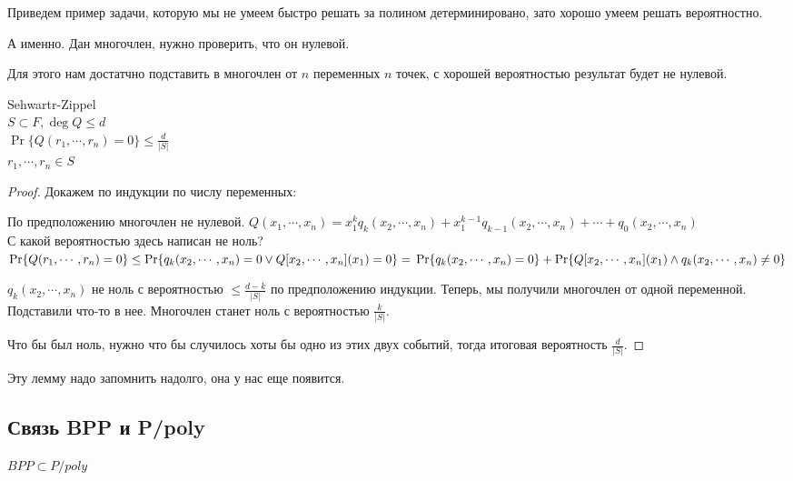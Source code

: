 Приведем пример задачи, которую мы не умеем быстро решать за полином детерминировано, 
зато хорошо умеем решать вероятностно. 

А именно. Дан многочлен, нужно проверить, что он нулевой. 

Для этого нам достатчно подставить в многочлен от $n$ переменных $n$ точек, 
с хорошей вероятностью результат будет не нулевой. 

\begin{lemma} Sehwartr-Zippel\\
	$S \subset F, \deg Q \le d$\\
	$\Pr\{Q(r_1, \cdots, r_n) = 0\} \le \frac{d}{|S|}$\\
	$r_1, \cdots, r_n \in S$\\
\end{lemma}

\begin{proof}
	Докажем по индукции по числу переменных:
	
	По предположению многочлен не нулевой. 
	$Q(x_1, \cdots, x_n) = x_1^kq_k(x_2,\cdots, x_n) + x_1^{k - 1}q_{k - 1}(x_2, \cdots, x_n) + \cdots + q_0(x_2, \cdots, x_n)$\\
	
	С какой вероятностью здесь написан не ноль? 
	$\Pr\{Q(r_1, \cdots, r_n) = 0\} \le \Pr\{q_k(x_2, \cdots, x_n) = 0 \vee Q[x_2, \cdots, x_n](x_1) = 0\}  =\\ 
	\Pr\{q_k(x_2, \cdots, x_n) = 0\} + \Pr\{Q[x_2, \cdots, x_n](x_1) \wedge q_k(x_2, \cdots, x_n) \ne 0\}$
	
	
	$q_k(x_2, \cdots, x_n)$ не ноль с вероятностью $\le \frac{d - k}{|S|}$ по предположению индукции. 
	Теперь, мы получили многочлен от одной переменной. Подставили что-то в нее. 
	Многочлен станет ноль с вероятностью $\frac{k}{|S|}$. 
	
	Что бы был ноль, нужно что бы случилось хоты бы одно из этих двух событий, тогда итоговая вероятность $\frac{d}{|S|}$.
\end{proof}

Эту лемму надо запомнить надолго, она у нас еще появится.

\subsection{Связь BPP и P/poly}

\begin{theorem}
	$BPP \subset P/poly$\\
\end{theorem}

